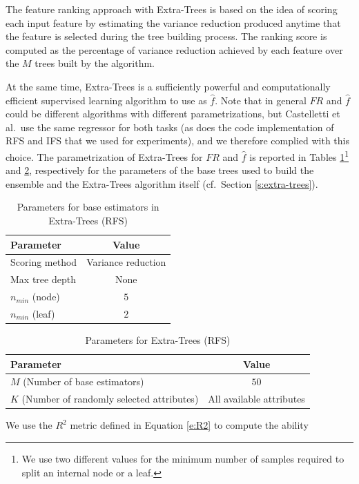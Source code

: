 The feature ranking approach with Extra-Trees is based on the idea of scoring
each input feature by estimating the variance reduction produced anytime that 
the feature is selected during the tree building process. The ranking score is
computed as the percentage of variance reduction achieved by each feature over 
the $M$ trees built by the algorithm.

At the same time, Extra-Trees is a sufficiently powerful and computationally 
efficient supervised learning algorithm to use as $\hat{f}$.
Note that in general $FR$ and $\hat{f}$ could be different algorithms with 
different parametrizations, but Castelletti et al.\ use the same regressor for 
both tasks (as does the code implementation of RFS and IFS that we used for 
experiments), and we therefore complied with this choice.
The parametrization of Extra-Trees for $FR$ and $\hat{f}$ is reported in Tables
\ref{t:RFS_tree_params}\footnote{We use two different values for the minimum 
number of samples required to split an internal node or a leaf.} and 
\ref{t:RFS_extra_params}, respectively for the parameters of the base trees used
to build the ensemble and the Extra-Trees algorithm itself (cf.\ Section 
\ref{s:extra-trees}).
%
\begin{table}[h]	
    \centering
    \begin{tabular}{l c} 
	\hline
	Parameter & Value \\ 
	\hline 
	Scoring method &  Variance reduction \\
	Max tree depth & None \\
	$n_{min}$ (node) & $5$\\
	$n_{min}$ (leaf) & $2$ \\
	\hline
    \end{tabular}
    \caption{Parameters for base estimators in Extra-Trees (RFS)}
    \label{t:RFS_tree_params}
\end{table}
%
%
\begin{table}[h]
    \centering
    \begin{tabular}{l c} 
	\hline
	Parameter & Value \\ 
	\hline 
	$M$ (Number of base estimators) & $50$ \\
	$K$ (Number of randomly selected attributes) &  All available attributes \\
	\hline
    \end{tabular}
    \caption{Parameters for Extra-Trees (RFS)}
    \label{t:RFS_extra_params}
\end{table}
%
We use the $R^2$ metric defined in Equation \eqref{e:R2} to compute the ability
